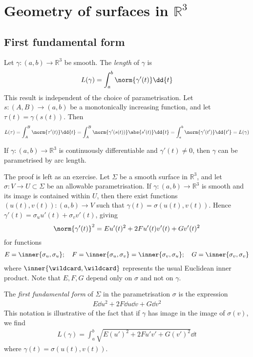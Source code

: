 \section{Geometry of surfaces in $\mathbb R^3$}

\subsection{First fundamental form}
Let $\gamma \colon (a,b) \to \mathbb R^3$ be smooth.
The \textit{length} of $\gamma$ is
\begin{align*}
	L(\gamma) = \int_a^b \norm{\gamma'(t)} \dd{t}
\end{align*}
This result is independent of the choice of parametrisation.
Let $s \colon (A,B) \to (a,b)$ be a monotonically increasing function, and let $\tau(t) = \gamma(s(t))$.
Then
\begin{align*}
	L(\tau) = \int_A^B \norm{\tau'(t)} \dd{t} = \int_A^B \norm{\gamma'(s(t))} \abs{s'(t)} \dd{t} = \int_a^b \norm{\gamma'(t')} \dd{t'} = L(\gamma)
\end{align*}
\begin{lemma}
	If $\gamma \colon (a,b) \to \mathbb R^3$ is continuously differentiable and $\gamma'(t) \neq 0$, then $\gamma$ can be parametrised by arc length.
\end{lemma}
The proof is left as an exercise.
Let $\Sigma$ be a smooth surface in $\mathbb R^3$, and let $\sigma \colon V \to U \subset \Sigma$ be an allowable parametrisation.
If $\gamma \colon (a,b) \to \mathbb R^3$ is smooth and its image is contained within $U$, then there exist functions $(u(t), v(t)) \colon (a,b) \to V$ such that $\gamma(t) = \sigma(u(t), v(t))$.
Hence $\gamma'(t) = \sigma_u u'(t) + \sigma_v v'(t)$, giving
\begin{align*}
	\norm{\gamma'(t)}^2 = E u'(t)^2 + 2F u'(t) v'(t) + G v'(t)^2
\end{align*}
for functions
\begin{align*}
	E = \inner{\sigma_u, \sigma_u};\quad F = \inner{\sigma_u, \sigma_v} = \inner{\sigma_v, \sigma_u};\quad G = \inner{\sigma_v, \sigma_v}
\end{align*}
where $\inner{\wildcard,\wildcard}$ represents the usual Euclidean inner product.
Note that $E, F, G$ depend only on $\sigma$ and not on $\gamma$.
\begin{definition}
	The \textit{first fundamental form} of $\Sigma$ in the parametrisation $\sigma$ is the expression
	\begin{align*}
		E \dd{u}^2 + 2F \dd{u} \dd{v} + G \dd{v}^2
	\end{align*}
	This notation is illustrative of the fact that if $\gamma$ has image in the image of $\sigma(v)$, we find
	\begin{align*}
		L(\gamma) = \int_a^b \sqrt{E (u')^2 + 2F u'v' + G (v')^2} \dd{t}
	\end{align*}
	where $\gamma(t) = \sigma(u(t),v(t))$.
\end{definition}
